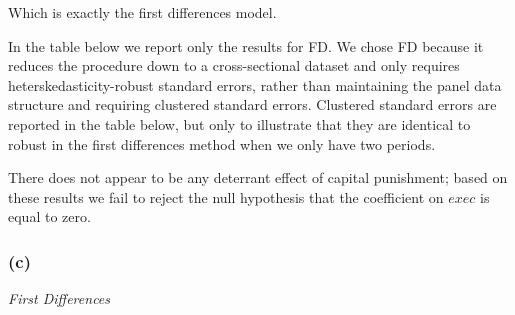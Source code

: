 \documentclass[
]{article}
\begin{document}
Which is exactly the first differences model.

In the table below we report only the results for FD. We chose FD
because it reduces the procedure down to a cross-sectional dataset and
only requires heterskedasticity-robust standard errors, rather than
maintaining the panel data structure and requiring clustered standard
errors. Clustered standard errors are reported in the table below, but
only to illustrate that they are identical to robust in the first
differences method when we only have two periods.

There does not appear to be any deterrant effect of capital punishment;
based on these results we fail to reject the null hypothesis that the
coefficient on \(exec\) is equal to zero.

\hypertarget{c-1}{%
\subsubsection{(c)}\label{c-1}}

\emph{First Differences}
\end{document}
